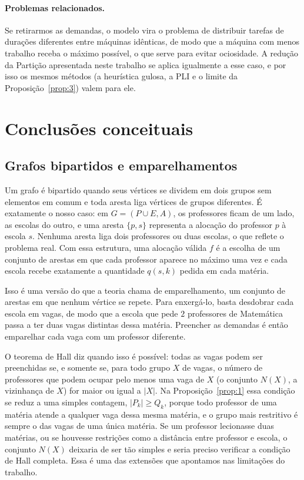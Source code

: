\documentclass[12pt,a4paper]{article}
\begin{document}
\paragraph{Problemas relacionados.} Se retirarmos as demandas, o modelo vira o problema de distribuir tarefas de durações diferentes entre máquinas idênticas, de modo que a máquina com menos trabalho receba o máximo possível, o que serve para evitar ociosidade. A redução da Partição apresentada neste trabalho se aplica igualmente a esse caso, e por isso os mesmos métodos (a heurística gulosa, a PLI e o limite da Proposição~\ref{prop:3}) valem para ele.


\section{Conclusões conceituais}

\subsection{Grafos bipartidos e emparelhamentos}

Um grafo é bipartido quando seus vértices se dividem em dois grupos sem elementos em comum e toda aresta liga vértices de grupos diferentes. É exatamente o nosso caso: em $G = (P \cup E, A)$, os professores ficam de um lado, as escolas do outro, e uma aresta $\{p, s\}$ representa a alocação do professor $p$ à escola $s$. Nenhuma aresta liga dois professores ou duas escolas, o que reflete o problema real. Com essa estrutura, uma alocação válida $f$ é a escolha de um conjunto de arestas em que cada professor aparece no máximo uma vez e cada escola recebe exatamente a quantidade $q(s,k)$ pedida em cada matéria.

Isso é uma versão do que a teoria chama de emparelhamento, um conjunto de arestas em que nenhum vértice se repete. Para enxergá-lo, basta desdobrar cada escola em vagas, de modo que a escola que pede $2$ professores de Matemática passa a ter duas vagas distintas dessa matéria. Preencher as demandas é então emparelhar cada vaga com um professor diferente.

O teorema de Hall diz quando isso é possível: todas as vagas podem ser preenchidas se, e somente se, para todo grupo $X$ de vagas, o número de professores que podem ocupar pelo menos uma vaga de $X$ (o conjunto $N(X)$, a vizinhança de $X$) for maior ou igual a $|X|$. Na Proposição~\ref{prop:1} essa condição se reduz a uma simples contagem, $|P_k| \ge Q_k$, porque todo professor de uma matéria atende a qualquer vaga dessa mesma matéria, e o grupo mais restritivo é sempre o das vagas de uma única matéria. Se um professor lecionasse duas matérias, ou se houvesse restrições como a distância entre professor e escola, o conjunto $N(X)$ deixaria de ser tão simples e seria preciso verificar a condição de Hall completa. Essa é uma das extensões que apontamos nas limitações do trabalho.
\end{document}
